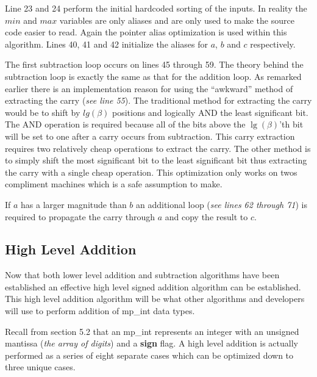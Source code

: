 \documentclass[b5paper]{book}
\begin{document}
Line 23 and 24 perform the initial hardcoded sorting of the inputs.  In reality the $min$ and $max$ variables are only aliases and are only 
used to make the source code easier to read.  Again the pointer alias optimization is used within this algorithm.  Lines 40, 41 and 42 initialize the aliases for 
$a$, $b$ and $c$ respectively.

The first subtraction loop occurs on lines 45 through 59.  The theory behind the subtraction loop is exactly the same as that for
the addition loop.  As remarked earlier there is an implementation reason for using the ``awkward'' method of extracting the carry 
(\textit{see line 55}).  The traditional method for extracting the carry would be to shift by $lg(\beta)$ positions and logically AND 
the least significant bit.  The AND operation is required because all of the bits above the $\lg(\beta)$'th bit will be set to one after a carry
occurs from subtraction.  This carry extraction requires two relatively cheap operations to extract the carry.  The other method is to simply 
shift the most significant bit to the least significant bit thus extracting the carry with a single cheap operation.  This optimization only works on
twos compliment machines which is a safe assumption to make.

If $a$ has a larger magnitude than $b$ an additional loop (\textit{see lines 62 through 71}) is required to propagate the carry through
$a$ and copy the result to $c$.  

\subsection{High Level Addition}
Now that both lower level addition and subtraction algorithms have been established an effective high level signed addition algorithm can be
established.  This high level addition algorithm will be what other algorithms and developers will use to perform addition of mp\_int data 
types.  

Recall from section 5.2 that an mp\_int represents an integer with an unsigned mantissa (\textit{the array of digits}) and a \textbf{sign} 
flag.  A high level addition is actually performed as a series of eight separate cases which can be optimized down to three unique cases.
\end{document}
